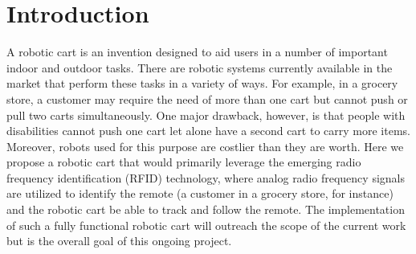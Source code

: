\documentclass[conference]{IEEEtran}
\begin{document}
\section{Introduction}
\label{sec:introduction}

A robotic cart is an invention designed to aid users in a number of important
indoor and outdoor tasks. There are robotic systems currently available in the
market that perform these tasks in a variety of ways. For example, in a grocery
store, a customer may require the need of more than one cart but cannot push or
pull two carts simultaneously. One major drawback, however, is that people with
disabilities cannot push one cart let alone have a second cart to carry more
items. Moreover, robots used for this purpose are costlier than they are worth.
Here we propose a robotic cart that would primarily leverage the emerging radio
frequency identification (RFID) technology, where analog radio frequency signals
are utilized to identify the remote (a customer in a grocery store, for
instance) and the robotic cart be able to track and follow the remote. The
implementation of such a fully functional robotic cart will outreach the scope
of the current work but is the overall goal of this ongoing project. 
\end{document}
